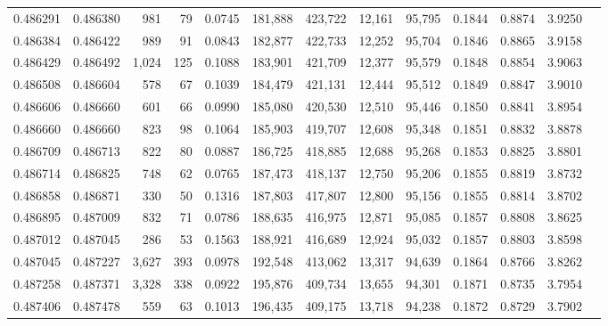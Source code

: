 \begin{tabular}{rrrrrrrrrrrrr}
0.486291 & 0.486380 &   981 &    79 &                                     0.0745 & 181,888 & 423,722 &  12,161 &  95,795 & 0.1844 & 0.8874 & 3.9250 \\
0.486384 & 0.486422 &   989 &    91 &                                     0.0843 & 182,877 & 422,733 &  12,252 &  95,704 & 0.1846 & 0.8865 & 3.9158 \\
0.486429 & 0.486492 & 1,024 &   125 &                                     0.1088 & 183,901 & 421,709 &  12,377 &  95,579 & 0.1848 & 0.8854 & 3.9063 \\
0.486508 & 0.486604 &   578 &    67 &                                     0.1039 & 184,479 & 421,131 &  12,444 &  95,512 & 0.1849 & 0.8847 & 3.9010 \\
0.486606 & 0.486660 &   601 &    66 &                                     0.0990 & 185,080 & 420,530 &  12,510 &  95,446 & 0.1850 & 0.8841 & 3.8954 \\
0.486660 & 0.486660 &   823 &    98 &                                     0.1064 & 185,903 & 419,707 &  12,608 &  95,348 & 0.1851 & 0.8832 & 3.8878 \\
0.486709 & 0.486713 &   822 &    80 &                                     0.0887 & 186,725 & 418,885 &  12,688 &  95,268 & 0.1853 & 0.8825 & 3.8801 \\
0.486714 & 0.486825 &   748 &    62 &                                     0.0765 & 187,473 & 418,137 &  12,750 &  95,206 & 0.1855 & 0.8819 & 3.8732 \\
0.486858 & 0.486871 &   330 &    50 &                                     0.1316 & 187,803 & 417,807 &  12,800 &  95,156 & 0.1855 & 0.8814 & 3.8702 \\
0.486895 & 0.487009 &   832 &    71 &                                     0.0786 & 188,635 & 416,975 &  12,871 &  95,085 & 0.1857 & 0.8808 & 3.8625 \\
0.487012 & 0.487045 &   286 &    53 &                                     0.1563 & 188,921 & 416,689 &  12,924 &  95,032 & 0.1857 & 0.8803 & 3.8598 \\
0.487045 & 0.487227 & 3,627 &   393 &                                     0.0978 & 192,548 & 413,062 &  13,317 &  94,639 & 0.1864 & 0.8766 & 3.8262 \\
0.487258 & 0.487371 & 3,328 &   338 &                                     0.0922 & 195,876 & 409,734 &  13,655 &  94,301 & 0.1871 & 0.8735 & 3.7954 \\
0.487406 & 0.487478 &   559 &    63 &                                     0.1013 & 196,435 & 409,175 &  13,718 &  94,238 & 0.1872 & 0.8729 & 3.7902 \\

\end{tabular}
